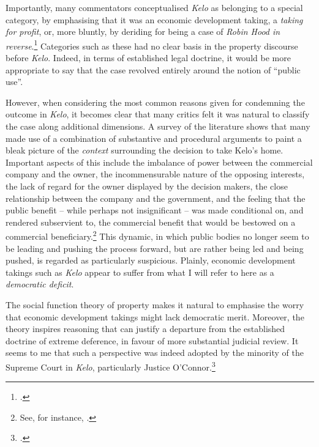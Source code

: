 Importantly, many commentators conceptualised {\it Kelo} as belonging to a special category, by emphasising that it was an economic development taking, a {\it taking for profit}, or, more bluntly, by deriding for being a case of {\it Robin Hood in reverse}.\footcite{somin05} Categories such as these had no clear basis in the property discourse before {\it Kelo}. Indeed, in terms of established legal doctrine, it would be more appropriate to say that the case revolved entirely around the notion of ``public use''.

However, when considering the most common reasons given for condemning the outcome in {\it Kelo}, it becomes clear that many critics felt it was natural to classify the case along additional dimensions. A survey of the literature shows that many made use of a combination of substantive and procedural arguments to paint a bleak picture of the {\it context} surrounding the decision to take Kelo's home. Important aspects of this include the imbalance of power between the commercial company and the owner, the incommensurable nature of the opposing interests, the lack of regard for the owner displayed by the decision makers, the close relationship between the company and the government, and the feeling that the public benefit -- while perhaps not insignificant -- was made conditional on, and rendered subservient to, the commercial benefit that would be bestowed on a commercial beneficiary.\footnote{See, for instance, \cite{underkuffler06,somin07,sandefur06,cohen06,hafetz09,hudson10}.} This dynamic, in which public bodies no longer seem to be leading and pushing the process forward, but are rather being led and being pushed, is regarded as particularly suspicious. Plainly, economic development takings such as {\it Kelo} appear to suffer from what I will refer to here as a {\it democratic deficit}.


The social function theory of property makes it natural to emphasise the worry that economic development takings might lack democratic merit. Moreover, the theory inspires reasoning that can justify a departure from the established doctrine of extreme deference, in favour of more substantial judicial review. It seems to me that such a perspective was indeed adopted by the minority of the Supreme Court in {\it Kelo}, particularly Justice O'Connor.\footnote{\cite[494-505]{kelo05}.}

